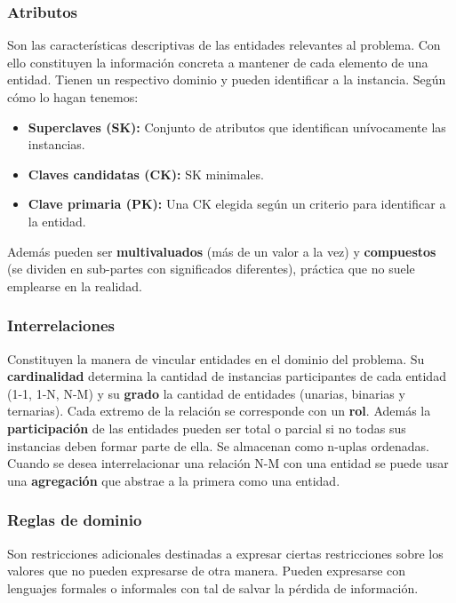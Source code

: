 \subsubsection*{Atributos}
Son las características descriptivas de las entidades relevantes al problema. Con ello constituyen la información concreta a mantener de cada elemento de una entidad. Tienen un respectivo dominio y pueden identificar a la instancia. Según cómo lo hagan tenemos:
\begin{itemize}
    \item \textbf{Superclaves (SK):} Conjunto de atributos que identifican unívocamente las instancias.
    \item \textbf{Claves candidatas (CK):} SK minimales.
    \item \textbf{Clave primaria (PK):} Una CK elegida según un criterio para identificar a la entidad.
\end{itemize}
Además pueden ser \textbf{multivaluados} (más de un valor a la vez) y \textbf{compuestos} (se dividen en sub-partes con significados diferentes), práctica que no suele emplearse en la realidad.

\subsubsection*{Interrelaciones}
Constituyen la manera de vincular entidades en el dominio del problema. Su \textbf{cardinalidad} determina la cantidad de instancias participantes de cada entidad (1-1, 1-N, N-M) y su \textbf{grado} la cantidad de entidades (unarias, binarias y ternarias). Cada extremo de la relación se corresponde con un \textbf{rol}. Además la \textbf{participación} de las entidades pueden ser total o parcial si no todas sus instancias deben formar parte de ella. Se almacenan como n-uplas ordenadas. \\
Cuando se desea interrelacionar una relación N-M con una entidad se puede usar una \textbf{agregación} que abstrae a la primera como una entidad.

\subsubsection*{Reglas de dominio}
Son restricciones adicionales destinadas a expresar ciertas restricciones sobre los valores que no pueden expresarse de otra manera. Pueden expresarse con lenguajes formales o informales con tal de salvar la pérdida de información.

